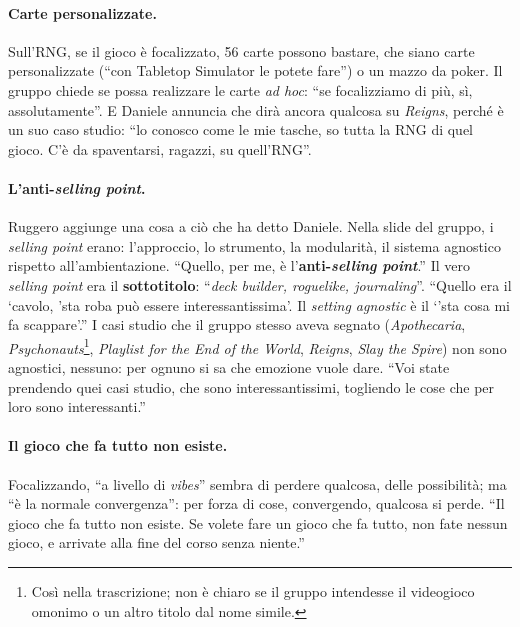 \paragraph{Carte personalizzate.} Sull'RNG, se il gioco è focalizzato, 56 carte possono
bastare, che siano carte personalizzate (``con Tabletop Simulator le potete fare'') o un
mazzo da poker. Il gruppo chiede se possa realizzare le carte \emph{ad hoc}: ``se
focalizziamo di più, sì, assolutamente''. E Daniele annuncia che dirà ancora qualcosa su
\emph{Reigns}, perché è un suo caso studio: ``lo conosco come le mie tasche, so tutta la
RNG di quel gioco. C'è da spaventarsi, ragazzi, su quell'RNG''.

\paragraph{L'anti-\emph{selling point}.} Ruggero aggiunge una cosa a ciò che ha detto
Daniele. Nella slide del gruppo, i \emph{selling point} erano: l'approccio, lo strumento,
la modularità, il sistema agnostico rispetto all'ambientazione. ``Quello, per me, è
l'\textbf{anti-\emph{selling point}}.'' Il vero \emph{selling point} era il
\textbf{sottotitolo}: ``\emph{deck builder, roguelike, journaling}''. ``Quello era il
`cavolo, 'sta roba può essere interessantissima'. Il \emph{setting agnostic} è il
`'sta cosa mi fa scappare'.'' I casi studio che il gruppo stesso aveva segnato
(\emph{Apothecaria}, \emph{Psychonauts}\footnote{Così nella trascrizione; non è chiaro se
il gruppo intendesse il videogioco omonimo o un altro titolo dal nome simile.},
\emph{Playlist for the End of the World}, \emph{Reigns}, \emph{Slay the Spire}) non sono
agnostici, nessuno: per ognuno si sa che emozione vuole dare. ``Voi state prendendo quei
casi studio, che sono interessantissimi, togliendo le cose che per loro sono
interessanti.''

\paragraph{Il gioco che fa tutto non esiste.} Focalizzando, ``a livello di \emph{vibes}''
sembra di perdere qualcosa, delle possibilità; ma ``è la normale convergenza'': per forza
di cose, convergendo, qualcosa si perde. ``Il gioco che fa tutto non esiste. Se volete
fare un gioco che fa tutto, non fate nessun gioco, e arrivate alla fine del corso senza
niente.''

